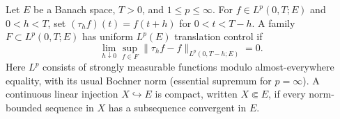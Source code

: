 Let $E$ be a Banach space, $T>0$, and $1\le p\le\infty$.
For $f\in L^p(0,T;E)$ and $0<h<T$, set $(\tau_h f)(t)=f(t+h)$ for $0<t<T-h$.
A family $F\subset L^p(0,T;E)$ has uniform $L^p(E)$ translation control if
\[
\lim_{h\downarrow0}\sup_{f\in F}\|\tau_hf-f\|_{L^p(0,T-h;E)}=0.
\]
Here $L^p$ consists of strongly measurable functions modulo almost-everywhere equality, with its usual Bochner norm (essential supremum for $p=\infty$).
A continuous linear injection $X\hookrightarrow E$ is compact, written $X\Subset E$, if every norm-bounded sequence in $X$ has a subsequence convergent in $E$.
